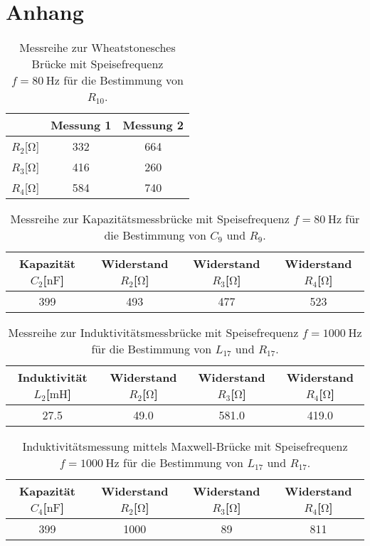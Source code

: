 \section{Anhang}

\begin{table}
    \centering
    \caption{Messreihe zur Wheatstonesches Brücke mit Speisefrequenz $f = \SI{80}{\hertz}$ für die Bestimmung von $R_{10}$.}
    \label{tab:weed}
    \begin{tabular}{c c c}
        \toprule
       ~ & Messung 1 & Messung 2 \\
        \midrule
      $R_{2}$[$\si{\ohm}$] & 332 &    664  \\
      $R_{3}$[$\si{\ohm}$] & 416 &    260\\
      $R_{4}$[$\si{\ohm}$] & 584 &    740\\
        \bottomrule
    \end{tabular}
    \end{table}

\begin{table}
    \centering
    \caption{Messreihe zur Kapazitätsmessbrücke mit Speisefrequenz $f = \SI{80}{\hertz}$ für die Bestimmung von $C_{9}$ und $R_{9}$.}
    \label{tab:nocap}
    \begin{tabular}{c c c c}
        \toprule
        Kapazität $C_{2}$[$\si{\nano\farad}$] & Widerstand $R_{2}$[$\si{\ohm}$] & Widerstand $R_{3}$[$\si{\ohm}$] & Widerstand $R_{4}$[$\si{\ohm}$]\\
        \midrule
        399 & 493 & 477 & 523  \\
        \bottomrule
    \end{tabular}
    \end{table}

\begin{table}
    \centering
    \caption{Messreihe zur Induktivitätsmessbrücke mit Speisefrequenz $f = \SI{1000}{\hertz}$ für die Bestimmung von $L_{17}$ und $R_{17}$.}
    \label{tab:spuleyo}
    \begin{tabular}{c c c c}
        \toprule
        Induktivität $L_{2}$[$\si{\milli\henry}$] & Widerstand $R_{2}$[$\si{\ohm}$] & Widerstand $R_{3}$[$\si{\ohm}$] & Widerstand $R_{4}$[$\si{\ohm}$]\\
        \midrule
        27.5 & 49.0 & 581.0 & 419.0  \\
        \bottomrule
    \end{tabular}
    \end{table}

\begin{table}[h!]
    \centering
    \caption{Induktivitätsmessung mittels Maxwell-Brücke mit Speisefrequenz $f = \SI{1000}{\hertz}$ für die Bestimmung von $L_{17}$ und $R_{17}$.}
    \label{tab:spuleyodiezweite}
    \begin{tabular}{c c c c}
        \toprule
        Kapazität $C_{4}$[$\si{\nano\farad}$] & Widerstand $R_{2}$[$\si{\ohm}$] & Widerstand $R_{3}$[$\si{\ohm}$] & Widerstand $R_{4}$[$\si{\ohm}$]\\
        \midrule
        399 & 1000 & 89 & 811  \\
        \bottomrule
    \end{tabular}
    \end{table}
    
